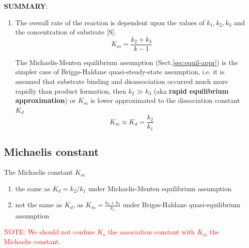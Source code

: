 {\bf SUMMARY}:
\begin{enumerate}
\item The overall rate of the reaction is dependent upon the values of
  $k_1, k_2, k_3$ and the concentration of substrate [S].
\begin{equation}
K_m = \frac{k_2+k_3}{k-1}
\end{equation}

The Michaelis-Menten equilibrium assumption (Sect.\ref{sec:equil-appr}) is the
simpler case of Briggs-Haldane quasi-steady-state assumption, i.e.  it is assumed
  that substrate binding and disassociation occurred much more rapidly
  than product formation, then $k_2 \gg k_3$ (aka
  {\bf rapid equilibrium approximation}) or $K_m$ is lower
  approximated to the dissociation constant $K_d$
\begin{equation}
  \label{eq:282}
  K_m \approx K_d= \frac{k_2}{k_1}
\end{equation}

\end{enumerate}



\subsection{Michaelis constant}
\label{sec:Michaelis-constant}

The Michaelis constant $K_m$ 
\begin{enumerate}
  \item the same as $K_d=k_2/k_1$ under Michaelis-Menten equilibrium assumption
  
  \item not the same as $K_d$, as $K_m=\frac{k_2+k_3}{k_1}$ under Brigss-Haldane
  quasi-equilibrium assumption
\end{enumerate}
\textcolor{red}{NOTE: We should not confuse $K_a$ the association constant with
$K_m$ the Michaelis constant}.

